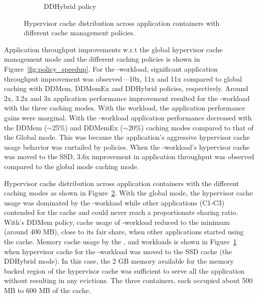 \begin{figure}[t]
\begin{subfigure}{0.38\textwidth}
 \caption{DDHybrid \dd{} policy}
 \label{fig:ddhybrid} 
\vspace{-0.2cm}
\end{subfigure} 
%
\caption{Hypervisor cache distribution across application containers with
         different cache management policies.}
\vspace{-0.7cm}
\label{fig:expt2}
\end{figure}

Application throughput improvements w.r.t the global hypervisor 
cache management mode 
and the different \dd{} caching policies is shown in Figure~\ref{fig:policy_speedup}.
%
For the \web-workload, significant application throughput improvement
was observed---10x, 11x and 11x compared to global caching with
DDMem, DDMemEx and DDHybrid policies, respectively.
%
Around 2x, 3.2x and 3x application performance improvement resulted 
for the \proxy-workload with the three \dd{} caching modes.
%
With the \mail{} workload, the application performance gains were marginal.
%
With the \video-workload application performance decreased with
the DDMem ($\sim$25\%) and DDMemEx ($\sim$20\%) caching modes
compared to that of the Global mode.
%
This was because the application's aggressive hypervisor cache usage 
behavior was curtailed by \dd{} policies.
%
When the \video-workload's hypervisor cache was moved to the SSD, 
3.6x improvement in application throughput was observed
compared to the global mode caching mode.

 

Hypervisor cache distribution across application containers
with the different caching modes 
as shown in Figure~\ref{fig:expt2}.
%
With the global mode, the hypervisor cache usage was dominated by the \video-workload
while other applications (C1-C3) contended for the cache
and could never reach a proportionate sharing ratio.
%
With\dd's DDMem policy, cache usage of \video-workload reduced to 
the minimum (around 400 MB), close to its fair share,
when other applications started using the cache.
%
Memory cache usage by the \web, \proxy{} and \mail{} workloads is shown in 
Figure~\ref{fig:ddhybrid} when hypervisor cache for the \video-workload 
was moved to the SSD cache (the DDHybrid mode). 
%
In this case, the 2 GB memory available for the memory backed
region of the \dd{} hypervisor cache
was sufficient to serve all the application without resulting in 
any evictions. The three containers, each occupied about 500 MB to 600 MB
of the cache.

